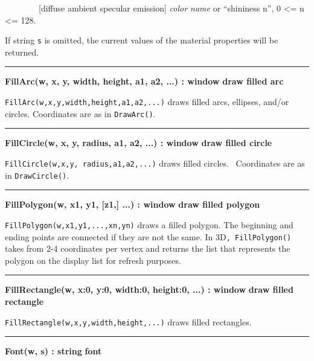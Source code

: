 \ \ \ \ \ \ \ \ [diffuse {\textbar} ambient {\textbar} specular
{\textbar} emission] \textit{color name} or
{\textquotedblleft}shininess n{\textquotedblright}, 0 {\textless}= n
{\textless}= 128.

If string \texttt{s} is omitted, the current values of the material
properties will be returned.

\bigskip\hrule\vspace{0.1cm}
\noindent
{\bf FillArc(w, x, y, width, height, a1, a2, ...) : window } \hfill {\bf draw filled arc}

\noindent
\texttt{FillArc(w,x,y,width,height,a1,a2,...)} draws filled arcs,
ellipses, and/or circles. Coordinates are as in \texttt{DrawArc()}.

\bigskip\hrule\vspace{0.1cm}
\noindent
{\bf FillCircle(w, x, y, radius, a1, a2, ...) : window } \hfill {\bf draw filled circle}

\noindent
\texttt{FillCircle(w,x,y, radius,a1,a2,...)} draws filled circles.
\ Coordinates are as in \texttt{DrawCircle()}.

\bigskip\hrule\vspace{0.1cm}
\noindent
{\bf FillPolygon(w, x1, y1, [z1,] ...) : window } \hfill {\bf draw filled polygon}

\noindent
\texttt{FillPolygon(w,x1,y1,...,xn,yn)} draws a filled polygon. The
beginning and ending points are connected if they are not the same. In
3D\texttt{, FillPolygon()} takes from 2-4 coordinates per vertex and
returns the list that represents the polygon on the display list for
refresh purposes. 

\bigskip\hrule\vspace{0.1cm}
\noindent
{\bf FillRectangle(w, x:0, y:0, width:0, height:0, ...) : window } \hfill {\bf draw filled rectangle}

\noindent
\texttt{FillRectangle(w,x,y,width,height,...)} draws filled rectangles.

\bigskip\hrule\vspace{0.1cm}
\noindent
{\bf Font(w, s) : string } \hfill {\bf font}

